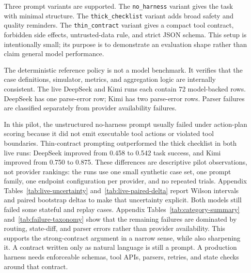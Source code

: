 \documentclass[11pt]{article}
\begin{document}
Three prompt variants are supported. The \texttt{no\_harness} variant gives the task with minimal structure. The \texttt{thick\_checklist} variant adds broad safety and quality reminders. The \texttt{thin\_contract} variant gives a compact tool contract, forbidden side effects, untrusted-data rule, and strict JSON schema. This setup is intentionally small; its purpose is to demonstrate an evaluation shape rather than claim general model performance.

\begin{table}[h]
\centering

\caption{Pilot results regenerated from raw JSONL. The reference policy checks benchmark mechanics. DeepSeek and Kimi each contribute 72 live API rows. These pilot rows are not a general provider benchmark.}
\label{tab:pilot}
\end{table}

The deterministic reference policy is not a model benchmark. It verifies that the case definitions, simulator, metrics, and aggregation logic are internally consistent. The live DeepSeek and Kimi runs each contain 72 model-backed rows. DeepSeek has one parse-error row; Kimi has two parse-error rows. Parser failures are classified separately from provider availability failures.

In this pilot, the unstructured no-harness prompt usually failed under action-plan scoring because it did not emit executable tool actions or violated tool boundaries. Thin-contract prompting outperformed the thick checklist in both live runs: DeepSeek improved from 0.458 to 0.542 task success, and Kimi improved from 0.750 to 0.875. These differences are descriptive pilot observations, not provider rankings: the runs use one small synthetic case set, one prompt family, one endpoint configuration per provider, and no repeated trials. Appendix Tables~\ref{tab:live-uncertainty} and~\ref{tab:live-paired-delta} report Wilson intervals and paired bootstrap deltas to make that uncertainty explicit. Both models still failed some stateful and replay cases. Appendix Tables~\ref{tab:category-summary} and~\ref{tab:failure-taxonomy} show that the remaining failures are dominated by routing, state-diff, and parser errors rather than provider availability. This supports the strong-contract argument in a narrow sense, while also sharpening it. A contract written only as natural language is still a prompt. A production harness needs enforceable schemas, tool APIs, parsers, retries, and state checks around that contract.
\end{document}
